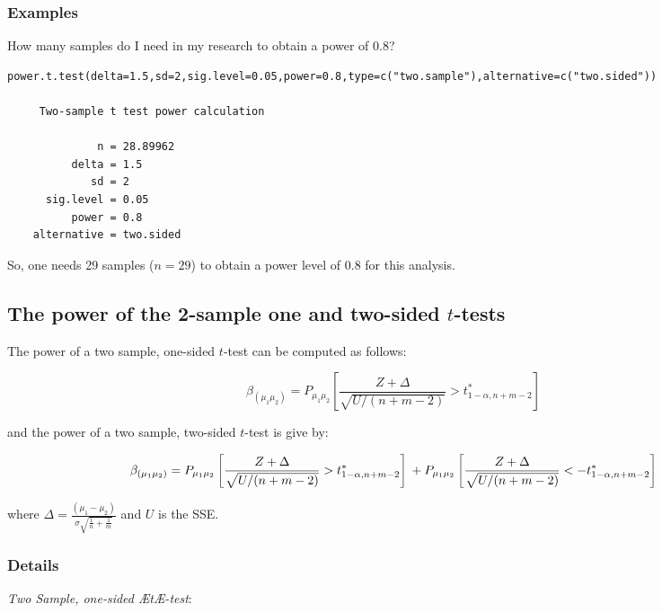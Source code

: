 \documentclass[12pt,a4paper]{article}
\theoremstyle{regla}
\theoremstyle{remark}
\theoremstyle{definition}
\theoremstyle{nonumberbreak}
\begin{document}
\subsubsection{Examples}
\begin{xmpl}
How many samples do I need in my research to obtain a power of 0.8?
\begin{lstlisting}
power.t.test(delta=1.5,sd=2,sig.level=0.05,power=0.8,type=c("two.sample"),alternative=c("two.sided"))

     Two-sample t test power calculation 

              n = 28.89962
          delta = 1.5
             sd = 2
      sig.level = 0.05
          power = 0.8
    alternative = two.sided

\end{lstlisting}
So, one needs 29 samples ($n=29$) to obtain a power level of 0.8 for this analysis.
\end{xmpl}

\subsection{The power of the 2-sample one and two-sided $t$-tests}
\begin{fbox}
\begin{minipage}{0.97\textwidth}
The power of a two sample, one-sided $t$-test can be computed as follows:

$$ \beta_{(\mu_1\mu_2)} = P_{\mu_1\mu_2}\left[ \frac{Z + \Delta}{\sqrt{U/(n+m-2)}} > t^\ast_{1-\alpha,n+m-2} \right] $$

and the power of a two sample, two-sided $t$-test is give by: 

$$\beta_{(\mu_1\mu_2)} = P_{\mu_1\mu_2}\left[ \frac{Z + \Delta}{\sqrt{U/(n+m-2)}} > t^\ast_{1-\alpha,n+m-2} \right]\\
+P_{\mu_1\mu_2}\left[ \frac{Z + \Delta}{\sqrt{U/(n+m-2)}} < -t^\ast_{1-\alpha,n+m-2} \right]$$

where $\Delta = \frac{(\mu_1-\mu_2)}{\sigma\sqrt{\frac{1}{n}+\frac{1}{m}}} $ and 
$U$ is the SSE.



\end{minipage}
\end{fbox}
\subsubsection{Details}
\emph{Two Sample, one-sided ÆtÆ-test}:
\end{document}
